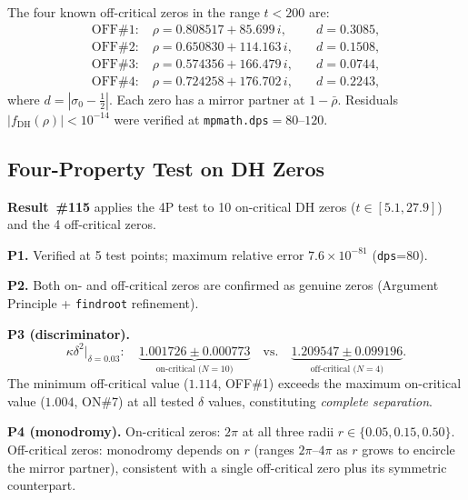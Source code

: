 \documentclass[11pt, a4paper]{article}
\theoremstyle{plain}
\theoremstyle{definition}
\newcommand{\DHf}{\mathrm{DH}}         %
\begin{document}
The four known off-critical zeros in the range $t<200$ are:
\begin{equation}
  \label{eq:dhzeros}
  \begin{aligned}
    \text{OFF\#1}: &\;\rho=0.808517+85.699\,i, &\quad d=0.3085,\\
    \text{OFF\#2}: &\;\rho=0.650830+114.163\,i, &\quad d=0.1508,\\
    \text{OFF\#3}: &\;\rho=0.574356+166.479\,i, &\quad d=0.0744,\\
    \text{OFF\#4}: &\;\rho=0.724258+176.702\,i, &\quad d=0.2243,
  \end{aligned}
\end{equation}
where $d=|\sigma_{0}-\tfrac{1}{2}|$.  Each zero has a mirror partner
at $1-\bar{\rho}$.  Residuals $|f_{\DHf}(\rho)|<10^{-14}$ were
verified at \texttt{mpmath.dps}$=80$--$120$.


\subsection{Four-Property Test on DH Zeros}
\label{ssec:dhtest}

\textbf{Result~\#115} applies the 4P test to 10 on-critical DH zeros
($t\in[5.1, 27.9]$) and the 4 off-critical zeros.

\medskip
\noindent\textbf{P1.} Verified at 5 test points; maximum relative error
$7.6\times10^{-81}$ (\texttt{dps}=80).

\medskip
\noindent\textbf{P2.} Both on- and off-critical zeros are confirmed as
genuine zeros (Argument Principle + \texttt{findroot} refinement).

\medskip
\noindent\textbf{P3 (discriminator).}
\begin{equation}
  \label{eq:p3disc}
  \kappa\delta^{2}\big|_{\delta=0.03}:
  \quad
  \underbrace{1.001726\pm 0.000773}_{\text{on-critical (}N=10\text{)}}
  \quad\text{vs.}\quad
  \underbrace{1.209547\pm 0.099196}_{\text{off-critical (}N=4\text{)}}.
\end{equation}
The minimum off-critical value ($1.114$, OFF\#1) exceeds the maximum
on-critical value ($1.004$, ON\#7) at all tested $\delta$ values,
constituting \emph{complete separation}.

\medskip
\noindent\textbf{P4 (monodromy).}  On-critical zeros: $2\pi$ at all
three radii $r\in\{0.05, 0.15, 0.50\}$.  Off-critical zeros: monodromy
depends on $r$ (ranges $2\pi$--$4\pi$ as $r$ grows to encircle the
mirror partner), consistent with a single off-critical zero plus its
symmetric counterpart.
\end{document}
